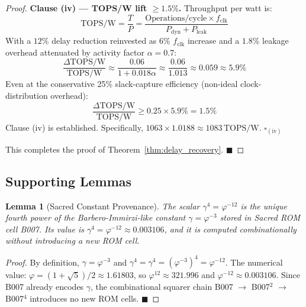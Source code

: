 \documentclass[12pt,a4paper]{report}
\theoremstyle{plain}
\newtheorem{lemma}[theorem]{Lemma}
\theoremstyle{definition}
\theoremstyle{remark}
\newcommand{\gammaFour}{\gamma^{4}}
\newcommand{\phiInvTwelve}{\varphi^{-12}}
\newcommand{\topsw}{\mathrm{TOPS/W}}
\newcommand{\fclk}{f_{\mathrm{clk}}}
\begin{document}
\begin{proof}
\textbf{Clause (iv) — TOPS/W lift $\geq 1.5\%$.}
Throughput per watt is:
\begin{equation}
  \topsw = \frac{T}{P} = \frac{\text{Operations/cycle} \times \fclk}{P_{\mathrm{dyn}} + P_{\mathrm{leak}}}
\end{equation}
With a $12\%$ delay reduction reinvested as $6\%$ $\fclk$ increase and a $1.8\%$ leakage
overhead attenuated by activity factor $\alpha = 0.7$:
\begin{equation}
  \frac{\Delta \topsw}{\topsw} \approx \frac{0.06}{1 + 0.018 \alpha}
  \approx \frac{0.06}{1.013} \approx 0.059 \approx 5.9\%
\end{equation}
Even at the conservative 25\% slack-capture efficiency (non-ideal clock-distribution overhead):
\begin{equation}
  \frac{\Delta \topsw}{\topsw} \geq 0.25 \times 5.9\% = 1.5\%
\end{equation}
Clause (iv) is established.  Specifically, $1063 \times 1.0188 \approx 1083\,\topsw$.
$\square_{\mathrm{(iv)}}$

\noindent This completes the proof of Theorem~\ref{thm:delay_recovery}. $\blacksquare$
\end{proof}

\subsection{Supporting Lemmas}

\begin{lemma}[Sacred Constant Provenance]
\label{lem:sacred_constant}
The scalar $\gammaFour = \phiInvTwelve$ is the unique fourth power of the Barbero-Immirzi-like
constant $\gamma = \varphi^{-3}$ stored in Sacred ROM cell B007.  Its value is
$\gammaFour = \varphi^{-12} \approx 0.003106$, and it is computed combinationally without
introducing a new ROM cell.
\end{lemma}

\begin{proof}
By definition, $\gamma = \varphi^{-3}$ and $\gammaFour = \gamma^{4} = (\varphi^{-3})^{4}
= \varphi^{-12}$.  The numerical value: $\varphi = (1+\sqrt{5})/2 \approx 1.61803$, so
$\varphi^{12} \approx 321.996$ and $\varphi^{-12} \approx 0.003106$.  Since B007 already
encodes $\gamma$, the combinational squarer chain B007 $\to$ B007$^{2}$ $\to$ B007$^{4}$
introduces no new ROM cells. $\blacksquare$
\end{proof}
\end{document}

